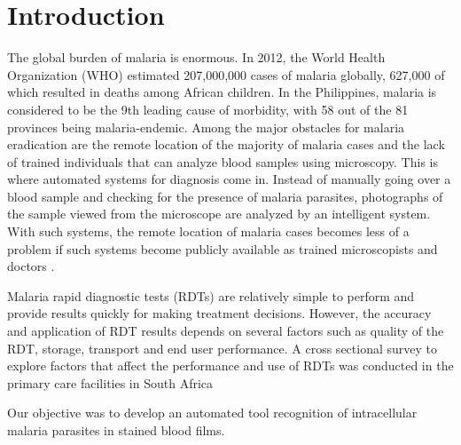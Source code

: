 \section{Introduction}
\label{intro}


The global burden of malaria is enormous. In 2012, the World Health Organization (WHO) estimated 207,000,000 cases of malaria globally, 627,000 of which resulted in deaths among African children. In the Philippines, malaria is considered to be the 9th leading cause of morbidity, with 58 out of the 81 provinces being malaria-endemic. Among the major obstacles for malaria eradication are the remote location of the majority of malaria cases and the lack
of trained individuals that can analyze blood samples using
microscopy. This is where automated systems for diagnosis
come in. Instead of manually going over a blood sample and
checking for the presence of malaria parasites, photographs
of the sample viewed from the microscope are analyzed by
an intelligent system. With such systems, the remote location
of malaria cases becomes less of a problem if such systems
become publicly available as trained microscopists and doctors \cite{Premaratne2006AFilms}\cite{Penas2017}.




Malaria rapid diagnostic tests (RDTs) are relatively simple to perform and provide results quickly for making treatment decisions. However, the accuracy and application of RDT
results depends on several factors such as quality of the RDT, storage, transport and end user performance. A cross sectional survey to explore factors that affect the performance and use of
RDTs was conducted in the primary care facilities in South Africa \cite{Moonasar2007}

Our objective was to develop an automated tool recognition of intracellular malaria parasites in stained blood films.   